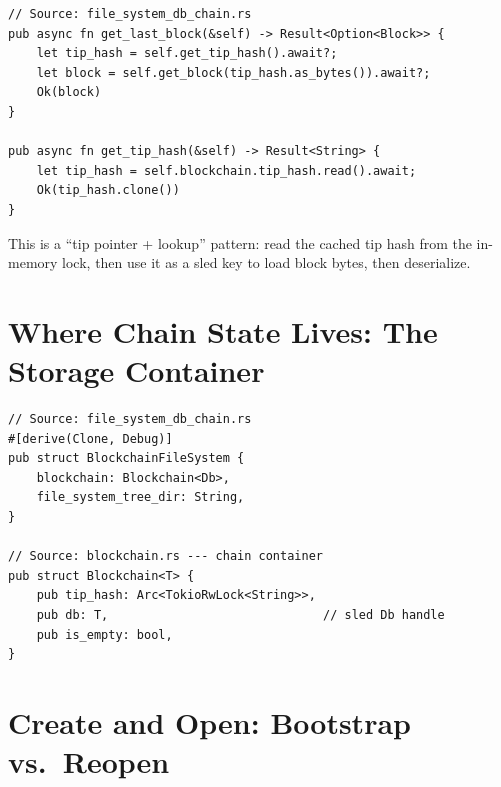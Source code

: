 \begin{listing}[H]
\caption{ and cached tip pointer}
\label{lst:ch09-3-6}
\begin{verbatim}
// Source: file_system_db_chain.rs
pub async fn get_last_block(&self) -> Result<Option<Block>> {
    let tip_hash = self.get_tip_hash().await?;
    let block = self.get_block(tip_hash.as_bytes()).await?;
    Ok(block)
}

pub async fn get_tip_hash(&self) -> Result<String> {
    let tip_hash = self.blockchain.tip_hash.read().await;
    Ok(tip_hash.clone())
}
\end{verbatim}
\end{listing}

\begin{checkpointbox}
This is a ``tip pointer + lookup'' pattern: read the cached tip hash from the in-memory lock, then use it as a sled key to load block bytes, then deserialize.
\end{checkpointbox}

\section{Where Chain State Lives: The Storage Container}
\label{sec:ch09-3-storage-container}

\begin{listing}[H]
\caption{ owns }
\label{lst:ch09-3-7}
\begin{verbatim}
// Source: file_system_db_chain.rs
#[derive(Clone, Debug)]
pub struct BlockchainFileSystem {
    blockchain: Blockchain<Db>,
    file_system_tree_dir: String,
}

// Source: blockchain.rs --- chain container
pub struct Blockchain<T> {
    pub tip_hash: Arc<TokioRwLock<String>>,
    pub db: T,                              // sled Db handle
    pub is_empty: bool,
}
\end{verbatim}
\end{listing}

\section{Create and Open: Bootstrap vs.\ Reopen}
\label{sec:ch09-3-create-open}

